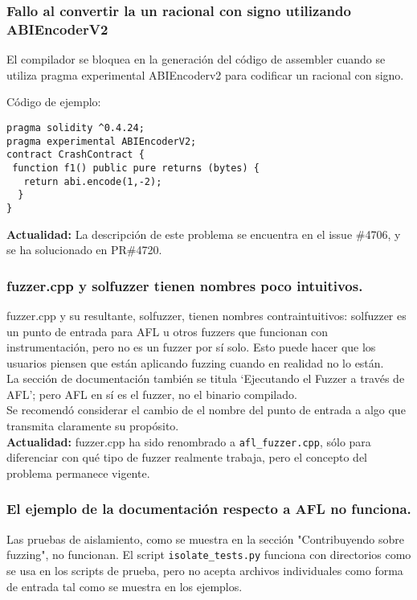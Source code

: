 \subsubsection{Fallo al convertir la un racional con signo utilizando ABIEncoderV2}

El compilador se bloquea en la generación del código de assembler cuando se utiliza pragma experimental ABIEncoderv2 para codificar un racional con signo.

Código de ejemplo:
\begin{lstlisting}[language=Solidity]
pragma solidity ^0.4.24;
pragma experimental ABIEncoderV2;
contract CrashContract {
 function f1() public pure returns (bytes) {
   return abi.encode(1,-2);
  }
}
\end{lstlisting}

\textbf{Actualidad:} La descripción de este problema se encuentra en el issue \#4706, y se ha solucionado en PR\#4720.


\subsubsection{fuzzer.cpp y solfuzzer tienen nombres poco intuitivos.}

fuzzer.cpp y su resultante, solfuzzer, tienen nombres contraintuitivos: solfuzzer es un punto de entrada para AFL u otros fuzzers que funcionan con instrumentación, pero no es un fuzzer por sí solo. Esto puede hacer que los usuarios piensen que están aplicando fuzzing cuando en realidad no lo están.\\

La sección de documentación también se titula ‘Ejecutando el Fuzzer a través de AFL’; pero AFL en sí es el fuzzer, no el binario compilado.\\

Se recomendó considerar el cambio de el nombre del punto de entrada a algo que transmita claramente su propósito.\\

\textbf{Actualidad:} fuzzer.cpp ha sido renombrado a \verb|afl_fuzzer.cpp|, sólo para diferenciar con qué tipo de fuzzer realmente trabaja, pero el concepto del problema permanece vigente.


\subsubsection{El ejemplo de la documentación respecto a AFL no funciona.}

Las pruebas de aislamiento, como se muestra en la sección "Contribuyendo sobre fuzzing", no funcionan. El script \verb|isolate_tests.py| funciona con directorios como se usa en los scripts de prueba, pero no acepta archivos individuales como forma de entrada tal como se muestra en los ejemplos.\\

